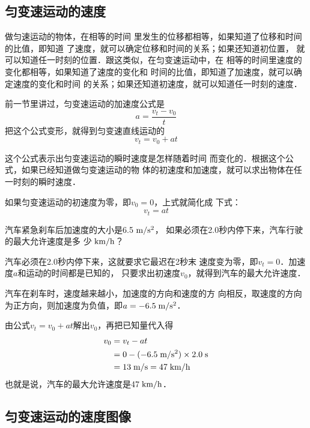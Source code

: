 \subsection{匀变速运动的速度}

做匀速运动的物体，在相等的时间
里发生的位移都相等，如果知道了位移和时间的比值，即知道
了速度，就可以确定位移和时间的关系；如果还知道初位置，
就可以知道任一时刻的位置．跟这类似，在匀变速运动中，在
相等的时间里速度的变化都相等，如果知道了速度的变化和
时间的比值，即知道了加速度，就可以确定速度的变化和时间
的关系；如果还知道初速度，就可以知道任一时刻的速度．

    前一节里讲过，匀变速运动的加速度公式是
\[a=\frac{v_t-v_0}{t} \]
把这个公式变形，就得到匀变速直线运动的
\[v_t=v_0+at \]

    这个公式表示出匀变速运动的瞬时速度是怎样随着时间
而变化的．根据这个公式，如果已经知道做匀变速运动的物
体的初速度和加速度，就可以求出物体在任一时刻的瞬时速度．

    如果匀变速运动的初速度为零，即$v_0=0$，上式就简化成
下式：
\[v_t=at \]


\begin{example}
汽车紧急刹车后加速度的大小是6.5$\;\text{m}/\text{s}^2$，
如果必须在2.0秒内停下来，汽车行驶的最大允许速度是多
少$\;\text{km}/\text{h}$？
\end{example}

\begin{solution}
    汽车必须在2.0秒内停下来，这就要求它最迟在2秒末
速度变为零，即$v_t=0$．加速度$a$和运动的时间都是已知的，
只要求出初速度$v_0$，就得到汽车的最大允许速度．

    汽车在刹车时，速度越来越小，加速度的方向和速度的方
向相反，取速度的方向为正方向，则加速度为负值，即$a=-
6.5\;\text{m}/\text{s}^2$．

    由公式$v_t=v_0+at$解出$v_0$，再把已知量代入得
\[\begin{split}
v_0&=v_t-at\\
&=0-(-6.5 \;\text{m}/\text{s}^2 )\times 2.0 \;\text{s} \\
&=13 \;\text{m}/\text{s}=47 \;\text{km}/\text{h}
\end{split} \]
也就是说，汽车的最大允许速度是47$\;\text{km}/\text{h}$．
\end{solution}


\subsection{匀变速运动的速度图像}


